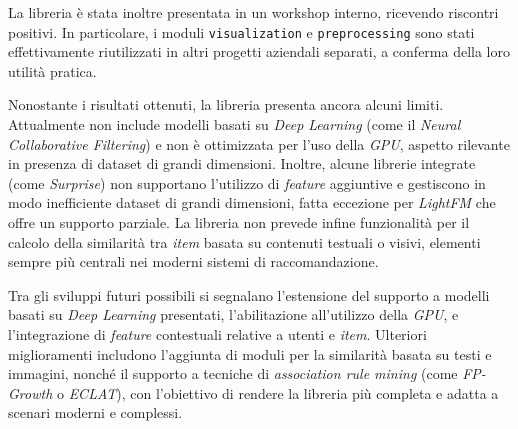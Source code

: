 La libreria è stata inoltre presentata in un workshop interno, ricevendo riscontri positivi. In particolare, i moduli \texttt{visualization} e \texttt{preprocessing} sono stati effettivamente riutilizzati in altri progetti aziendali separati, a conferma della loro utilità pratica.

Nonostante i risultati ottenuti, la libreria presenta ancora alcuni limiti. Attualmente non include modelli basati su \textit{Deep Learning} (come il \textit{Neural Collaborative Filtering}) e non è ottimizzata per l'uso della \textit{GPU}, aspetto rilevante in presenza di dataset di grandi dimensioni. Inoltre, alcune librerie integrate (come \textit{Surprise}) non supportano l'utilizzo di \textit{feature} aggiuntive e gestiscono in modo inefficiente dataset di grandi dimensioni, fatta eccezione per \textit{LightFM} che offre un supporto parziale. La libreria non prevede infine funzionalità per il calcolo della similarità tra \textit{item} basata su contenuti testuali o visivi, elementi sempre più centrali nei moderni sistemi di raccomandazione.

Tra gli sviluppi futuri possibili si segnalano l'estensione del supporto a modelli basati su \textit{Deep Learning} presentati, l'abilitazione all'utilizzo della \textit{GPU}, e l'integrazione di \textit{feature} contestuali relative a utenti e \textit{item}. Ulteriori miglioramenti includono l'aggiunta di moduli per la similarità basata su testi e immagini, nonché il supporto a tecniche di \textit{association rule mining} (come \textit{FP-Growth} o \textit{ECLAT}), con l'obiettivo di rendere la libreria più completa e adatta a scenari moderni e complessi.

